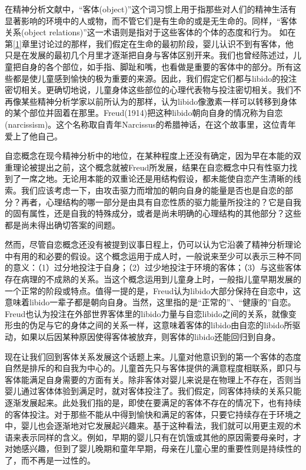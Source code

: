 \documentclass[UTF8,10pt,a4paper,openany]{book}
\begin{document}
在精神分析文献中，“客体(object)”这个词习惯上用于指那些对人们的精神生活有显著影响的环境中的人或物，而不管它们是有生命的或是无生命的。同样，“客体关系(object relations)”这一术语则是指对于这些客体的个体的态度和行为。
如在第\ref{1}章里讨论过的那样，我们假定在生命的最初阶段，婴儿认识不到有客体，他只是在发展的最初几个月里才逐渐把自身与客体区别开来。我们也曾经陈述过，儿童把自身的各个部位，如手指、脚趾和嘴，也看做是重要的客体中的部分。所有这些都是使儿童感到愉快的极为重要的来源。因此，我们假定它们都与libido的投注密切相关。更确切地说，儿童身体这些部位的心理代表物与投注密切相关。我们不再像某些精神分析学家以前所认为的那样，认为libido像激素一样可以转移到身体的某个部位并固着在那里。Freud(1914)把这种libido朝向自身的情况称为自恋(narcissism)。这个名称取自青年Narcissus的希腊神话，在这个故事里，这位青年爱上了他自己。

自恋概念在现今精神分析中的地位，在某种程度上还没有确定，因为早在本能的双重理论被提出之前，这个概念就被Freud所发展，结果在自恋概念中只有性驱力找到了一席之地。无论用本能的双重论还是用结构假设，都未能使自恋产生清晰的线索。我们应该考虑一下，由攻击驱力而增加的朝向自身的能量是否也是自恋的部分？再者，心理结构的哪一部分是由具有自恋性质的驱力能量所投注的？它是自我的固有属性，还是自我的特殊成分，或者是尚未明确的心理结构的其他部分？这些都是尚未得出确切答案的间题。

然而，尽管自恋概念还没有被提到议事日程上，仍可以认为它沿袭了精神分析理论中有用的和必要的假设。这个概念运用于成人时，一般说来至少可以表示三种不同的意义：（1）过分地投注于自身；（2）过少地投注于环境的客体；（3）与这些客体存在病理的不成熟的关系。当这个概念运用到儿童身上时，一般指儿童早期发展的一个正常的阶段或特点。值得一提的是，Freud认为libido大部分保持在自恋中，这意味着libido一辈子都是朝向自身。当然，这里指的是“正常的”、“健康的”自恋。Freud也认为投注在外部世界客体里的libido力量与自恋libido之间的关系，就像变形虫的伪足与它的身体之间的关系一样，这意味着客体的libido由自恋的libido所驱动，如果以后因某种原因使得客体被放弃，则客体的libido还能回归到自身。

现在让我们回到客体关系发展这个话题上来。儿童对他意识到的第一个客体的态度自然是排斥的和自我为中心的。儿童首先只与客体提供的满意程度相联系，即只与客体能满足自身需要的方面有关。除非客体对婴儿来说是在物理上不存在，否则当婴儿通过客体体验到满足时，就对客体投注了。我们假定，同客体持续的关系只能逐渐发展起来。此处我们指的是，即使在要满足的客体不存在的情况下，也有持续的客体投注。对于那些不能从中得到愉快和满足的客体，只要它持续存在于环境之中，婴儿也会逐渐地对它发展起兴趣来。基于这种看法，我们就可以用更主观的术语来表示同样的含义。例如，早期的婴儿只有在饥饿或其他的原因需要母亲时，才对她感兴趣，但到了婴儿晚期和童年早期，母亲在儿童心里的重要性则是持续性的了，而不再是一过性的。
\end{document}
